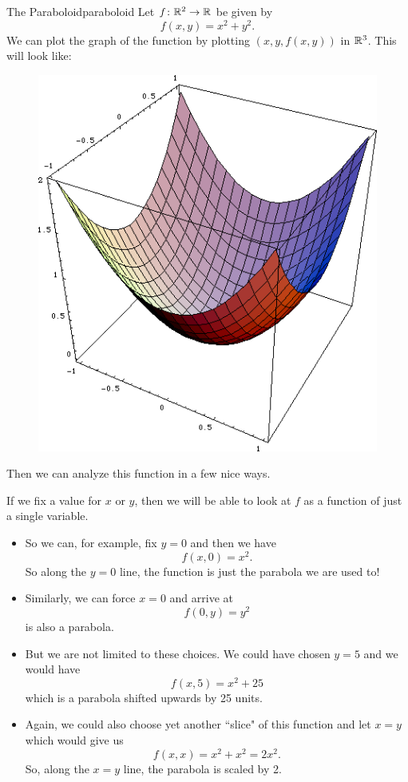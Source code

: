                 \begin{ex}{The Paraboloid}{paraboloid}
                Let $f\colon \mathbb{R}^2 \to \mathbb{R}$ be given by
                \[
                f(x,y)=x^2+y^2.
                \]
                We can plot the graph of the function by plotting $(x,y, f(x,y))$ in $\mathbb{R}^3$.  This will look like:
                \begin{figure}[H]
                    \centering
                    \includegraphics[width=.4\textwidth]{Figures_Part_6/paraboloid.png}
                \end{figure}
                Then we can analyze this function in a few nice ways.  
                
                If we fix a value for $x$ or $y$, then we will be able to look at $f$ as a function of just a single variable.  
                \begin{itemize}
                \item So we can, for example, fix $y=0$ and then we have
                \[
                f(x,0)=x^2.
                \]
                So along the $y=0$ line, the function is just the parabola we are used to! 
                
                \item Similarly, we can force $x=0$ and arrive at
                \[
                f(0,y)=y^2
                \]
                is also a parabola.  
                
                \item But we are not limited to these choices.  We could have chosen $y=5$ and we would have
                \[
                f(x,5)=x^2+25
                \]
                which is a parabola shifted upwards by 25 units.
                
                \item  Again, we could also choose yet another ``slice" of this function and let $x=y$ which would give us
                \[
                f(x,x)=x^2+x^2=2x^2.
                \]
                So, along the $x=y$ line, the parabola is scaled by 2.
                

\end{itemize}
\end{ex}
